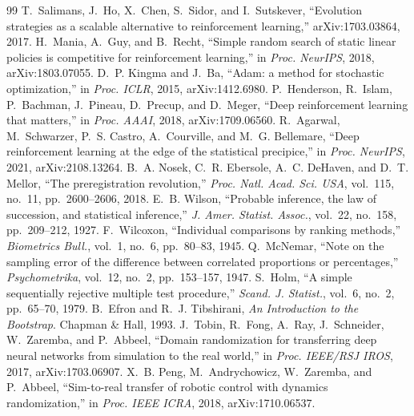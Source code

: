 \begin{thebibliography}{99}
 T.~Salimans, J.~Ho, X.~Chen, S.~Sidor, and I.~Sutskever, ``Evolution strategies as a scalable alternative to reinforcement learning,'' arXiv:1703.03864, 2017.
 H.~Mania, A.~Guy, and B.~Recht, ``Simple random search of static linear policies is competitive for reinforcement learning,'' in \emph{Proc. NeurIPS}, 2018, arXiv:1803.07055.
 D.~P. Kingma and J.~Ba, ``Adam: a method for stochastic optimization,'' in \emph{Proc. ICLR}, 2015, arXiv:1412.6980.
 P.~Henderson, R.~Islam, P.~Bachman, J.~Pineau, D.~Precup, and D.~Meger, ``Deep reinforcement learning that matters,'' in \emph{Proc. AAAI}, 2018, arXiv:1709.06560.
 R.~Agarwal, M.~Schwarzer, P.~S. Castro, A.~Courville, and M.~G. Bellemare, ``Deep reinforcement learning at the edge of the statistical precipice,'' in \emph{Proc. NeurIPS}, 2021, arXiv:2108.13264.
 B.~A. Nosek, C.~R. Ebersole, A.~C. DeHaven, and D.~T. Mellor, ``The preregistration revolution,'' \emph{Proc. Natl. Acad. Sci. USA}, vol.~115, no.~11, pp.~2600--2606, 2018.
 E.~B. Wilson, ``Probable inference, the law of succession, and statistical inference,'' \emph{J. Amer. Statist. Assoc.}, vol.~22, no.~158, pp.~209--212, 1927.
 F.~Wilcoxon, ``Individual comparisons by ranking methods,'' \emph{Biometrics Bull.}, vol.~1, no.~6, pp.~80--83, 1945.
 Q.~McNemar, ``Note on the sampling error of the difference between correlated proportions or percentages,'' \emph{Psychometrika}, vol.~12, no.~2, pp.~153--157, 1947.
 S.~Holm, ``A simple sequentially rejective multiple test procedure,'' \emph{Scand. J. Statist.}, vol.~6, no.~2, pp.~65--70, 1979.
 B.~Efron and R.~J. Tibshirani, \emph{An Introduction to the Bootstrap}. Chapman \& Hall, 1993.
 J.~Tobin, R.~Fong, A.~Ray, J.~Schneider, W.~Zaremba, and P.~Abbeel, ``Domain randomization for transferring deep neural networks from simulation to the real world,'' in \emph{Proc. IEEE/RSJ IROS}, 2017, arXiv:1703.06907.
 X.~B. Peng, M.~Andrychowicz, W.~Zaremba, and P.~Abbeel, ``Sim-to-real transfer of robotic control with dynamics randomization,'' in \emph{Proc. IEEE ICRA}, 2018, arXiv:1710.06537.
\end{thebibliography}
